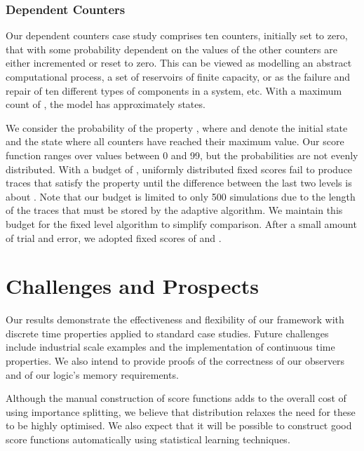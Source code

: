 \documentclass{llncs}
\begin{document}
\vspace{-1em}



\subsubsection*{Dependent Counters}

Our dependent counters case study comprises ten counters, initially
set to zero, that with some probability dependent on the values of
the other counters are either incremented or reset to zero. This can
be viewed as modelling an abstract computational process, a set of
reservoirs of finite capacity, or as the failure and repair of ten
different types of components in a system, etc. With a maximum count
of , the model has approximately  states.

We consider the probability of the property ,
where  and  denote the initial
state and the state where all counters have reached their maximum
value. Our score function ranges over values between 0 and 99, but
the probabilities are not evenly distributed. With a budget of ,
uniformly distributed fixed scores fail to produce traces that satisfy
the property until the difference between the last two levels is about
. Note that our budget is limited to only 500 simulations due
to the length of the traces that must be stored by the adaptive algorithm.
We maintain this budget for the fixed level algorithm to simplify
comparison. After a small amount of trial and error, we adopted fixed
scores of  and . 


\section{Challenges and Prospects}

Our results demonstrate the effectiveness and flexibility of our framework
with discrete time properties applied to standard case studies. Future
challenges include industrial scale examples and the implementation
of continuous time properties. We also intend to provide proofs of
the correctness of our observers and of our logic's memory requirements.

Although the manual construction of score functions adds to the overall
cost of using importance splitting, we believe that distribution relaxes
the need for these to be highly optimised. We also expect that it
will be possible to construct good score functions automatically using
statistical learning techniques.



\end{document}
